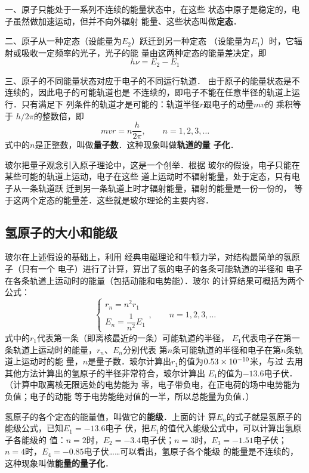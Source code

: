 一、原子只能处于一系列不连续的能量状态中，在这些
状态中原子是稳定的，电子虽然做加速运动，但并不向外辐射
能量、这些状态叫做\textbf{定态}．

二、原子从一种定态（设能量为$E_2$）跃迁到另一种定态
（设能量为$E_1$）时，它辐射或吸收一定频率的光子，光子的能
量由这两种定态的能量差决定，即
\[h\nu=E_2-E_1\]

三、原子的不同能量状态对应于电子的不同运行轨道．
由于原子的能量状态是不连续的，因此电子的可能轨道也是
不连续的，即电子不能在任意半径的轨道上运行．只有满足下
列条件的轨道才是可能的：轨道半径$r$跟电子的动量$mv$的
乘积等于 $h/2\pi$的整数倍，即
\[mvr=n\frac{h}{2\pi},\qquad n=1,2,3,\ldots\]
式中的$n$是正整数，叫做\textbf{量子数}．这种现象叫做\textbf{轨道的量
子化}．

玻尔把量子观念引入原子理论中，这是一个创举．根据
玻尔的假设，电子只能在某些可能的轨道上运动，电子在这些
道上运动时不辐射能量，处于定态，只有电子从一条轨道跃
迁到另一条轨道上时才辐射能量，辐射的能量是一份一份的，
等于这两个定态的能量差．这些就是玻尔理论的主要内容．

\subsection{氢原子的大小和能级}

玻尔在上述假设的基础上，利用
经典电磁理论和牛顿力学，对结构最简单的氢原子（只有一个
电子）进行了计算，算出了氢的电子的各条可能轨道的半径和
电子在各条轨道上运动时的能量（包括动能和电势能）．玻尔
的计算结果可概括为两个公式：
\[\begin{cases}
    r_n=n^2 r_1\\
    E_n=\dfrac{1}{n^2}E_1
\end{cases},\qquad n=1,2,3,\ldots\]
式中的$r_1$代表第一条（即离核最近的一条）可能轨道的半径，
$E_1$代表电子在第一条轨道上运动时的能量，$r_n$、$E_n$分别代表
第$n$条可能轨道的半径和电子在第$n$条轨道上运动时的能
量，$n$是量子数．玻尔计算出$r_1$的值为$0.53\times10^{-10}$米，与过
去用其他方法计算出的氢原子的半径非常符合，玻尔计算出
$E_1$的值为$-13.6$电子伏．（计算中取离核无限远处的电势能为
零，电子带负电，在正电荷的场中电势能为负值；电子的动能
等于电势能绝对值的一半，所以总能量为负值．）

氢原子的各个定态的能量值，叫做它的\textbf{能级}．上面的计
算$E_n$的式子就是氢原子的能级公式，已知$E_1=-13.6$电子
伏，把$E_1$的值代入能级公式中，可以计算出氢原子各能级的
值：$n=2$时，$E_2=-3.4$电子伏；$n=3$时，$E_3=-1.51$电子伏；
$n=4$时，$E_4=-0.85$电子伏……可以看出，氢原子各个能级
的能量是不连续的，这种现象叫做\textbf{能量的量子化}．


